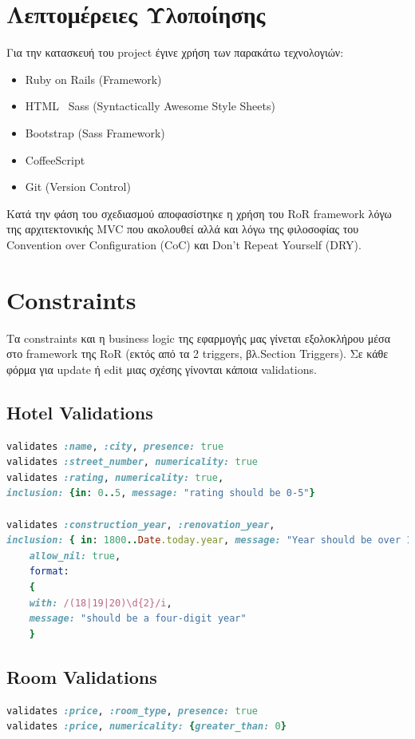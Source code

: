 \documentclass[a4paper,12pt]{article}
\begin{document}
\section{Λεπτομέρειες Υλοποίησης}
Για την κατασκευή του project έγινε χρήση των παρακάτω τεχνολογιών:
\begin{itemize}
  \item Ruby on Rails (Framework)
  \item HTML \ Sass (Syntactically Awesome Style Sheets) 
  \item Bootstrap (Sass Framework)
  \item CoffeeScript
  \item Git (Version Control)
\end{itemize}

Κατά την φάση του σχεδιασμού αποφασίστηκε η χρήση του RoR framework λόγω της αρχιτεκτονικής MVC που ακολουθεί αλλά και λόγω της φιλοσοφίας του Convention over Configuration (CoC) και Don't Repeat Yourself (DRY).

\section{Constraints}
Τα constraints και η business logic της εφαρμογής μας γίνεται εξολοκλήρου μέσα στο framework της RoR (εκτός από τα 2 triggers, βλ.Section Triggers).
Σε κάθε φόρμα για update ή edit μιας σχέσης γίνονται κάποια validations.\\
\subsection{Hotel Validations}
	\begin{lstlisting}[language=Ruby]
validates :name, :city, presence: true
validates :street_number, numericality: true
validates :rating, numericality: true, 
inclusion: {in: 0..5, message: "rating should be 0-5"}

validates :construction_year, :renovation_year,
inclusion: { in: 1800..Date.today.year, message: "Year should be over 1800"},
 	allow_nil: true,
 	format: 
 	{ 
   	with: /(18|19|20)\d{2}/i, 
   	message: "should be a four-digit year"
 	}
	\end{lstlisting}

\subsection{Room Validations}
	\begin{lstlisting}[language=Ruby]
validates :price, :room_type, presence: true
validates :price, numericality: {greater_than: 0}
	\end{lstlisting}
	
\end{document}
